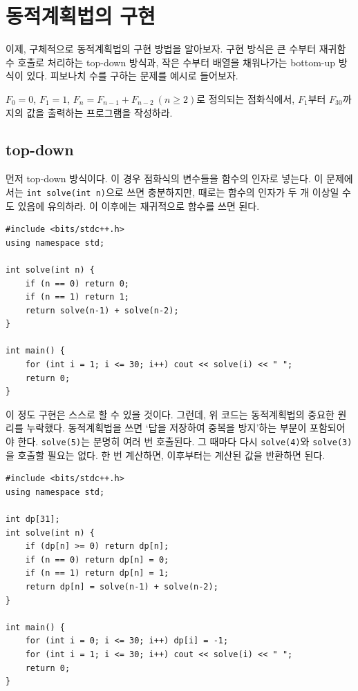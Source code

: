 \section{동적계획법의 구현}

이제, 구체적으로 동적계획법의 구현 방법을 알아보자. 구현 방식은 큰 수부터 재귀함수 호출로 처리하는 top-down 방식과, 작은 수부터 배열을 채워나가는 bottom-up 방식이 있다. 피보나치 수를 구하는 문제를 예시로 들어보자.
\begin{example}
    $F_0 = 0$, $F_1 = 1$, $F_n = F_{n-1} + F_{n-2} ~ (n \geq 2)$로 정의되는 점화식에서, $F_1$부터 $F_{30}$까지의 값을 출력하는 프로그램을 작성하라.
\end{example}

\subsection{top-down}
먼저 top-down 방식이다. 이 경우 점화식의 변수들을 함수의 인자로 넣는다. 이 문제에서는 \texttt{int solve(int n)}으로 쓰면 충분하지만, 때로는 함수의 인자가 두 개 이상일 수도 있음에 유의하라. 이 이후에는 재귀적으로 함수를 쓰면 된다.

\begin{lstlisting}
#include <bits/stdc++.h>
using namespace std;

int solve(int n) {
    if (n == 0) return 0;
    if (n == 1) return 1;
    return solve(n-1) + solve(n-2);
}

int main() {
    for (int i = 1; i <= 30; i++) cout << solve(i) << " ";
    return 0;
}
\end{lstlisting}

이 정도 구현은 스스로 할 수 있을 것이다. 그런데, 위 코드는 동적계획법의 중요한 원리를 누락했다. 동적계획법을 쓰면 `답을 저장하여 중복을 방지'하는 부분이 포함되어야 한다. \texttt{solve(5)}는 분명히 여러 번 호출된다. 그 때마다 다시 \texttt{solve(4)}와 \texttt{solve(3)}을 호출할 필요는 없다. 한 번 계산하면, 이후부터는 계산된 값을 반환하면 된다.

\begin{lstlisting}
#include <bits/stdc++.h>
using namespace std;

int dp[31];
int solve(int n) {
    if (dp[n] >= 0) return dp[n];
    if (n == 0) return dp[n] = 0;
    if (n == 1) return dp[n] = 1;
    return dp[n] = solve(n-1) + solve(n-2);
}

int main() {
    for (int i = 0; i <= 30; i++) dp[i] = -1;
    for (int i = 1; i <= 30; i++) cout << solve(i) << " ";
    return 0;
}
\end{lstlisting}


